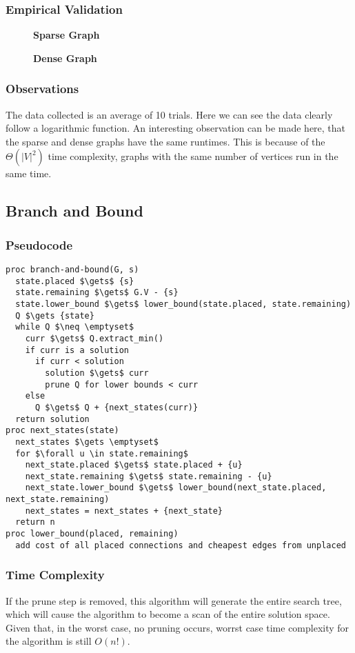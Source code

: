 \documentclass[a4paper,12pt]{article}
\begin{document}
\subsubsection{Empirical Validation}
\begin{figure}[H]
  \centering
  \textbf{Sparse Graph}\par\medskip
\end{figure}
\begin{figure}[H]
  \centering
  \textbf{Dense Graph}\par\medskip
\end{figure}
\subsubsection{Observations}
The data collected is an average of 10 trials. Here we can see the data clearly follow a logarithmic function. An interesting observation can be made here, that the sparse and dense graphs have the same runtimes. This is because of the $\Theta(|V|^2)$ time complexity, graphs with the same number of vertices run in the same time.
\subsection{Branch and Bound}
\subsubsection{Pseudocode}
\begin{lstlisting}[mathescape=true]
proc branch-and-bound(G, s)
  state.placed $\gets$ {s}
  state.remaining $\gets$ G.V - {s}
  state.lower_bound $\gets$ lower_bound(state.placed, state.remaining)
  Q $\gets {state}
  while Q $\neq \emptyset$
    curr $\gets$ Q.extract_min()
    if curr is a solution
      if curr < solution
        solution $\gets$ curr
        prune Q for lower bounds < curr
    else
      Q $\gets$ Q + {next_states(curr)}
  return solution
proc next_states(state)
  next_states $\gets \emptyset$
  for $\forall u \in state.remaining$
    next_state.placed $\gets$ state.placed + {u}
    next_state.remaining $\gets$ state.remaining - {u}
    next_state.lower_bound $\gets$ lower_bound(next_state.placed, next_state.remaining)
    next_states = next_states + {next_state}
  return n
proc lower_bound(placed, remaining)
  add cost of all placed connections and cheapest edges from unplaced
\end{lstlisting}
\subsubsection{Time Complexity}
If the prune step is removed, this algorithm will generate the entire search tree, which will cause the algorithm to become a scan of the entire solution space. Given that, in the worst case, no pruning occurs, worrst case time complexity for the algorithm is still $O(n!)$.
\end{document}
